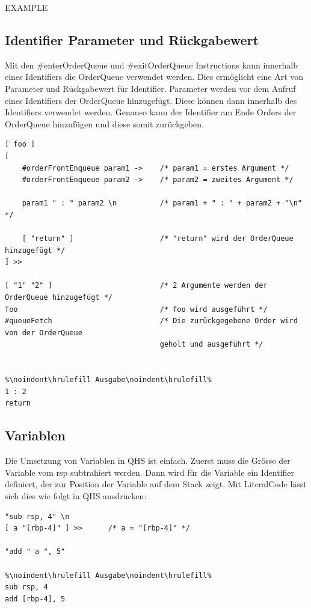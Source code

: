 EXAMPLE

\subsection{Identifier Parameter und Rückgabewert}
Mit den \#enterOrderQueue und \#exitOrderQueue Instructions kann innerhalb eines Identifiers die OrderQueue verwendet werden. Dies ermöglicht eine Art von Parameter und Rückgabewert für Identifier.
Parameter werden vor dem Aufruf eines Identifiers der OrderQueue hinzugefügt. Diese können dann innerhalb des Identifiers verwendet werden.
Genauso kann der Identifier am Ende Orders der OrderQueue hinzufügen und diese somit zurückgeben.

\begin{lstlisting}[language=QHS, caption=Verwendung von Parametern und Rückgabewert eines Identifiers]
[ foo ]
[
    #orderFrontEnqueue param1 ->    /* param1 = erstes Argument */
    #orderFrontEnqueue param2 ->    /* param2 = zweites Argument */

    param1 " : " param2 \n          /* param1 + " : " + param2 + "\n" */

    [ "return" ]                    /* "return" wird der OrderQueue hinzugefügt */
] >>

[ "1" "2" ]                         /* 2 Argumente werden der OrderQueue hinzugefügt */
foo                                 /* foo wird ausgeführt */
#queueFetch                         /* Die zurückgegebene Order wird von der OrderQueue
                                    geholt und ausgeführt */


%\noindent\hrulefill Ausgabe\noindent\hrulefill%
1 : 2
return
\end{lstlisting}


\subsection{Variablen} \label{sec:qhs-vars}
Die Umsetzung von Variablen in QHS ist einfach. 
Zuerst muss die Grösse der Variable vom rsp subtrahiert werden.
Dann wird für die Variable ein Identifier definiert, der zur Position der Variable auf dem Stack zeigt.
Mit LiteralCode lässt sich dies wie folgt in QHS ausdrücken:

\begin{lstlisting}[language=QHS, caption=Definition einer Variable mit LiteralCode]
"sub rsp, 4" \n
[ a "[rbp-4]" ] >>      /* a = "[rbp-4]" */

"add " a ", 5"

%\noindent\hrulefill Ausgabe\noindent\hrulefill%
sub rsp, 4
add [rbp-4], 5
\end{lstlisting}


